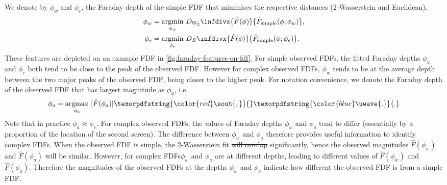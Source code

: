\documentclass[11pt, a4paper]{book}
\providecommand{\DIFaddtex}[1]{{\protect\color{blue}\uwave{#1}}} %
\providecommand{\DIFdeltex}[1]{{\protect\color{red}\sout{#1}}}                      %
\providecommand{\DIFaddbegin}{} %
\providecommand{\DIFaddend}{} %
\providecommand{\DIFdelbegin}{} %
\providecommand{\DIFdelend}{} %
\providecommand{\DIFadd}[1]{\texorpdfstring{\DIFaddtex{#1}}{#1}} %
\providecommand{\DIFdel}[1]{\texorpdfstring{\DIFdeltex{#1}}{}} %
\newcommand{\DIFscaledelfig}{0.5}
\newlength{\DIFdelgraphicswidth} %
\newlength{\DIFdelgraphicsheight} %
\newcommand{\DIFaddincludegraphics}[2][]{{\color{blue}\fbox{\DIFOincludegraphics[#1]{#2}}}} %
\newcommand{\DIFdelincludegraphics}[2][]{%
\sbox{\DIFdelgraphicsbox}{\DIFOincludegraphics[#1]{#2}}%
\settoboxwidth{\DIFdelgraphicswidth}{\DIFdelgraphicsbox} %
\settoboxtotalheight{\DIFdelgraphicsheight}{\DIFdelgraphicsbox} %
\scalebox{\DIFscaledelfig}{%
\parbox[b]{\DIFdelgraphicswidth}{\usebox{\DIFdelgraphicsbox}\\[-\baselineskip] \rule{\DIFdelgraphicswidth}{0em}}\llap{\resizebox{\DIFdelgraphicswidth}{\DIFdelgraphicsheight}{%
\setlength{\unitlength}{\DIFdelgraphicswidth}%
\begin{picture}(1,1)%
\thicklines\linethickness{2pt} %
{\color[rgb]{1,0,0}\put(0,0){\framebox(1,1){}}}%
{\color[rgb]{1,0,0}\put(0,0){\line( 1,1){1}}}%
{\color[rgb]{1,0,0}\put(0,1){\line(1,-1){1}}}%
\end{picture}%
}\hspace*{3pt}}} %
} %
\DeclareRobustCommand{\DIFaddbegin}{\DIFOaddbegin \let\includegraphics\DIFaddincludegraphics} %
\DeclareRobustCommand{\DIFaddend}{\DIFOaddend \let\includegraphics\DIFOincludegraphics} %
\DeclareRobustCommand{\DIFdelbegin}{\DIFOdelbegin \let\includegraphics\DIFdelincludegraphics} %
\DeclareRobustCommand{\DIFdelend}{\DIFOaddend \let\includegraphics\DIFOincludegraphics} %
\begin{document}
    We denote by $\phi_w$ and $\phi_e$, the Faraday depth of the simple FDF that minimises the respective distances
    (2-Wasserstein and Euclidean).
    \begin{align*}
       \phi_w &= \underset{\phi_w}{\mathrm{argmin}}\ D_{W_2}\infdivx{\hat F(\phi)}{\hat F_{\mathrm{simple}}(\phi; \phi_w)},\\
       \phi_e &= \underset{\phi_e}{\mathrm{argmin}}\ D_E\infdivx{\hat F(\phi)}{\hat F_{\mathrm{simple}}(\phi; \phi_e)}.
     \end{align*}
     These features are depicted on an example FDF in \autoref{fig:faraday-features-on-fdf}.
     For simple observed FDFs, the fitted Faraday depths $\phi_w$ and $\phi_e$ both tend to be
     close to the peak of the observed FDF. However for complex observed FDFs, $\phi_w$ tends
     to be at the average depth between the two major peaks of the observed FDF, being closer
     to the higher peak. For notation convenience, we denote the Faraday depth of the
     observed FDF that has largest magnitude as $\phi_a$, i.e.
     \begin{equation*}
       \phi_a = \underset{\phi_a}{\mathrm{argmax}}\ |\hat F(\phi_a)|\DIFdelbegin \DIFdel{,}%
\DIFdelend \DIFaddbegin \DIFadd{.
     }\DIFaddend \end{equation*}
     Note that in practice $\phi_a \approx \phi_e$.
     For complex observed FDFs, the values of Faraday depths $\phi_w$ and $\phi_a$ tend
     to differ (essentially by a proportion of the location of the second screen).
     The difference between $\phi_w$ and $\phi_a$ therefore provides useful information
     to identify complex FDFs.
     When the observed FDF is simple, the 2-Wasserstein fit \DIFdelbegin \DIFdel{will overlap }\DIFdelend \DIFaddbegin \DIFadd{overlaps }\DIFaddend significantly,
     hence the observed magnitudes $\hat F(\phi_w)$ and $\hat F(\phi_a)$ will be similar.
     However, for complex FDFs\DIFaddbegin \DIFadd{, }\DIFaddend $\phi_w$ and $\phi_a$ are at different depths,
     leading to different values of $\hat F(\phi_w)$ and $\hat F(\phi_a)$.
     Therefore the magnitudes of the observed FDFs at the depths $\phi_w$ and $\phi_a$
     indicate how different the observed FDF is from a simple FDF.
\end{document}
